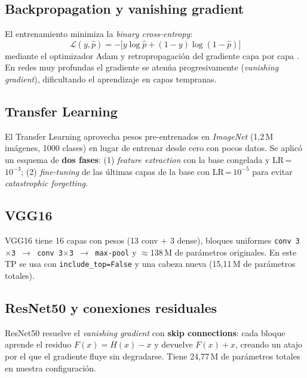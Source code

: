 \documentclass[1p,12pt]{elsarticle}
\begin{document}
\subsection{Backpropagation y vanishing gradient}

El entrenamiento minimiza la \textit{binary cross-entropy}:
\begin{equation}
  \mathcal{L}(y, \hat{p}) = -\bigl[y \log \hat{p} + (1-y) \log (1-\hat{p})\bigr]
  \label{eq:bce}
\end{equation}
mediante el optimizador Adam \cite{kingma2014} y retropropagación del gradiente capa por capa \cite{rumelhart1986}. En redes muy profundas el gradiente se atenúa progresivamente (\textit{vanishing gradient}), dificultando el aprendizaje en capas tempranas.

\subsection{Transfer Learning}

El Transfer Learning aprovecha pesos pre-entrenados en \textit{ImageNet} (1,2\,M imágenes, 1000 clases) en lugar de entrenar desde cero con pocos datos. Se aplicó un esquema de \textbf{dos fases}: (1) \textit{feature extraction} con la base congelada y LR\,=\,$10^{-3}$; (2) \textit{fine-tuning} de las últimas capas de la base con LR\,=\,$10^{-5}$ para evitar \textit{catastrophic forgetting}.

\subsection{VGG16}

VGG16 \cite{simonyan2014} tiene 16 capas con pesos (13 conv + 3 dense), bloques uniformes \texttt{conv~3$\times$3 $\to$ conv~3$\times$3 $\to$ max-pool} y $\approx$138\,M de parámetros originales. En este TP se usa con \texttt{include\_top=False} y una cabeza nueva (15,11\,M de parámetros totales).

\subsection{ResNet50 y conexiones residuales}

ResNet50 \cite{he2015} resuelve el \textit{vanishing gradient} con \textbf{skip connections}: cada bloque aprende el residuo $F(x) = H(x) - x$ y devuelve $F(x) + x$, creando un atajo por el que el gradiente fluye sin degradarse. Tiene 24,77\,M de parámetros totales en nuestra configuración.
\end{document}
